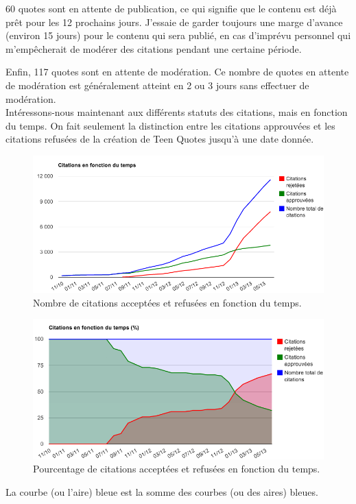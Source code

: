 \documentclass{report}
\begin{document}
	60 quotes sont en attente de publication, ce qui signifie que le contenu est déjà prêt pour les 12 prochains jours. J'essaie de garder toujours une marge d'avance (environ 15 jours) pour le contenu qui sera publié, en cas d'imprévu personnel qui m'empêcherait de modérer des citations pendant une certaine période.

	Enfin, 117 quotes sont en attente de modération. Ce nombre de quotes en attente de modération est généralement atteint en 2 ou 3 jours sans effectuer de modération.\\

	Intéressons-nous maintenant aux différents statuts des citations, mais en fonction du temps. On fait seulement la distinction entre les citations approuvées et les citations refusées de la création de Teen Quotes jusqu'à une date donnée.
	\begin{figure}[H]
		\center
		\includegraphics[width=450px]{images/statutsQuotesTemps.png}
		\caption{Nombre de citations acceptées et refusées en fonction du temps.}
	\end{figure}

	\begin{figure}[H]
		\center
		\includegraphics[width=450px]{images/statutsQuotesTempsPourcentage.png}
		\caption{Pourcentage de citations acceptées et refusées en fonction du temps.}
	\end{figure}
	
	La courbe (ou l'aire) bleue est la somme des courbes (ou des aires) bleues. 
\end{document}
